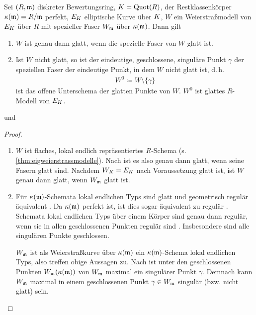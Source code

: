 \documentclass[german]{scrreprt}
\begin{document}
\begin{Lemma}\label{thm:weierstrassglatt}
  Sei $(R,\mathfrak{m})$ diskreter Bewertungsring,
  $K=\operatorname{Quot}(R)$,
  der Restklassenkörper $\kappa(\mathfrak{m})=R/\mathfrak{m}$ perfekt,
  $E_{K}$ elliptische Kurve über $K$,
  $W$ ein Weierstraßmodell von $E_{K}$ über $R$
  mit spezieller Faser $W_{\mathfrak{m}}$ über $\kappa(\mathfrak{m})$.
  Dann gilt
  \begin{enumerate}[label=(\alph*)]
  \item $W$ ist genau dann glatt, wenn die spezielle Faser von $W$ glatt
    ist.
  \item Ist $W$ nicht glatt, so ist der eindeutige, geschlossene,
    singuläre Punkt $\gamma$ der speziellen Faser der eindeutige
    Punkt, in dem $W$ nicht glatt ist, d.\,h.
    \begin{gather*}
      W^0\coloneqq W\setminus \{\gamma\}
    \end{gather*}
    ist das offene Unterschema der glatten Punkte von $W$.
    $W^0$ ist glattes $R$-Modell von $E_{K}$.
  \end{enumerate}
  
  \cite[Remark IV.5.4.1]{silverman2} und \cite[für die Definition von
  guter Reduktion][Chapter VII.5]{silverman}

  \begin{proof}
    \begin{enumerate}[label=(\alph*)]
    \item $W$ ist flaches, lokal endlich repräsentiertes
      $R$-Schema (s. \autoref{thm:eigweierstrassmodelle}).
      Nach \cite[8.5, Proposition 17]{bosch} ist es also genau dann
      glatt, wenn seine Fasern glatt sind.
      Nachdem $W_{K}=E_{K}$ nach Voraussetzung glatt ist, ist $W$ genau
      dann glatt, wenn $W_{\mathfrak{m}}$ glatt ist.
    \item Für $\kappa(\mathfrak{m})$-Schemata lokal endlichen Typs sind glatt und
      geometrisch regulär äquivalent \cite[Corollary 6.32]{wedhorn}.
      Da $\kappa(\mathfrak{m})$ perfekt ist, ist dies sogar äquivalent zu regulär
      \cite[Remark 6.33]{wedhorn}.
      Schemata lokal endlichen Typs über einem Körper sind genau dann
      regulär, wenn sie in allen geschlossenen Punkten regulär sind
      \cite[Remark 6.25 (3)]{wedhorn}. Insbesondere sind alle
      singulären Punkte geschlossen.

      $W_{\mathfrak{m}}$ ist als Weierstraßkurve über $\kappa(\mathfrak{m})$ ein $\kappa(\mathfrak{m})$-Schema
      lokal endlichen Typs, also treffen obige Aussagen zu.
      Nach \cite[Proposition III.1.4]{silverman} ist unter den
      geschlossenen Punkten $W_{\mathfrak{m}}(\kappa(\mathfrak{m}))$ von $W_{\mathfrak{m}}$ maximal ein
      singulärer Punkt $\gamma$. Demnach kann $W_{\mathfrak{m}}$ maximal in einem
      geschlossenen Punkt $\gamma\in W_{\mathfrak{m}}$ singulär (bzw. nicht
      glatt) sein.


\end{enumerate}
\end{proof}
\end{Lemma}
\end{document}
